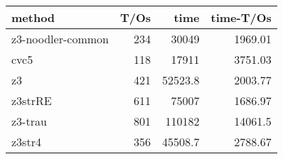 \begin{tabular}{lrrr}
\hline
 method            &   T/Os &     time &   time-T/Os \\
\hline
 z3-noodler-common &    234 &  30049   &     1969.01 \\
 cvc5              &    118 &  17911   &     3751.03 \\
 z3                &    421 &  52523.8 &     2003.77 \\
 z3strRE           &    611 &  75007   &     1686.97 \\
 z3-trau           &    801 & 110182   &    14061.5  \\
 z3str4            &    356 &  45508.7 &     2788.67 \\
\hline
\end{tabular}
